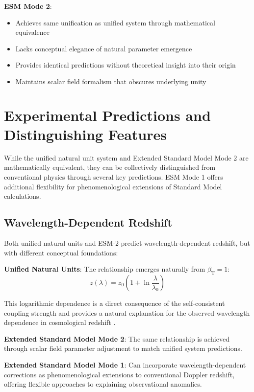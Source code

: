 \documentclass[12pt,a4paper]{article}
\newcommand{\betaT}{\beta_{\text{T}}}
\begin{document}
	\textbf{ESM Mode 2}:
	\begin{itemize}
		\item Achieves same unification as unified system through mathematical equivalence
		\item Lacks conceptual elegance of natural parameter emergence
		\item Provides identical predictions without theoretical insight into their origin
		\item Maintains scalar field formalism that obscures underlying unity
	\end{itemize}
	
	\section{Experimental Predictions and Distinguishing Features}
	\label{sec:experimental_predictions}
	
	While the unified natural unit system and Extended Standard Model Mode 2 are mathematically equivalent, they can be collectively distinguished from conventional physics through several key predictions. ESM Mode 1 offers additional flexibility for phenomenological extensions of Standard Model calculations.
	
	\subsection{Wavelength-Dependent Redshift}
	\label{subsec:wavelength_dependent_redshift}
	
	Both unified natural units and ESM-2 predict wavelength-dependent redshift, but with different conceptual foundations:
	
	\textbf{Unified Natural Units}: The relationship emerges naturally from $\betaT = 1$:
	\begin{equation}
		z(\lambda) = z_0\left(1 + \ln\frac{\lambda}{\lambda_0}\right)
	\end{equation}
	
	This logarithmic dependence is a direct consequence of the self-consistent coupling strength and provides a natural explanation for the observed wavelength dependence in cosmological redshift \cite{pascher_unified_2025}.
	
	\textbf{Extended Standard Model Mode 2}: The same relationship is achieved through scalar field parameter adjustment to match unified system predictions.
	
	\textbf{Extended Standard Model Mode 1}: Can incorporate wavelength-dependent corrections as phenomenological extensions to conventional Doppler redshift, offering flexible approaches to explaining observational anomalies.
	
\end{document}
